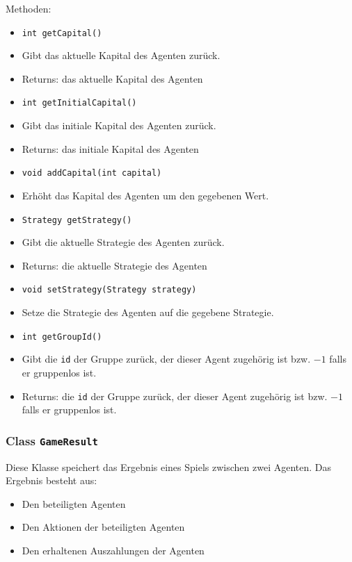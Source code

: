 \documentclass[parskip=full,11pt]{scrartcl}
\begin{document}
Methoden:
\begin{itemize}\itemsep -10pt
\item \texttt{int getCapital()}
\item[] Gibt das aktuelle Kapital des Agenten zurück.
\item[] Returns: das aktuelle Kapital des Agenten

\item \texttt{int getInitialCapital()}
\item[] Gibt das initiale Kapital des Agenten zurück.
\item[] Returns: das initiale Kapital des Agenten

\item \texttt{void addCapital(int capital)}
\item[] Erhöht das Kapital des Agenten um den gegebenen Wert.

\item \texttt{Strategy getStrategy()}
\item[] Gibt die aktuelle Strategie des Agenten zurück.
\item[] Returns: die aktuelle Strategie des Agenten

\item\texttt{void setStrategy(Strategy strategy)}
\item[] Setze die Strategie des Agenten auf die gegebene Strategie.

\item \texttt{int getGroupId()}
\item[] Gibt die \texttt{id} der Gruppe zurück, der dieser Agent zugehörig ist bzw. \(-1\) falls er gruppenlos ist.
\item[] Returns: die \texttt{id} der Gruppe zurück, der dieser Agent zugehörig ist bzw. \(-1\) falls er gruppenlos ist.
\end{itemize}

\subsubsection{Class \texttt{GameResult}}

Diese Klasse speichert das Ergebnis eines Spiels zwischen zwei Agenten. Das Ergebnis besteht aus:
\begin{itemize}\itemsep -10pt
	\item Den beteiligten Agenten
	\item Den Aktionen der beteiligten Agenten
	\item Den erhaltenen Auszahlungen der Agenten
\end{itemize}
	
\end{document}
